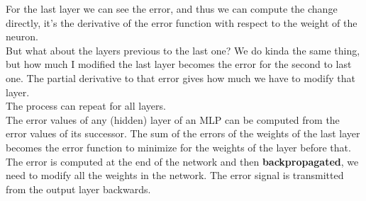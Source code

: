 \documentclass[11pt]{article}
\begin{document}
		For the last layer we can see the error, and thus we can compute the change directly, it's the derivative of the error function with respect to the weight of the neuron.\\
		But what about the layers previous to the last one? We do kinda the same thing, but how much I modified the last layer becomes the error for the second to last one. The partial derivative to that error gives how much we have to modify that layer.\\
		The process can repeat for all layers.\\
		
		The error values of any (hidden) layer of an MLP can be computed from the error values of its successor. The sum of the errors of the weights of the last layer becomes the error function to minimize for the weights of the layer before that.\\
		 
		The error is computed at the end of the network and then \textbf{backpropagated}, we need to modify all the weights in the network. The error signal is transmitted from the output layer backwards.\\
		
		\newpage
		
\end{document}
